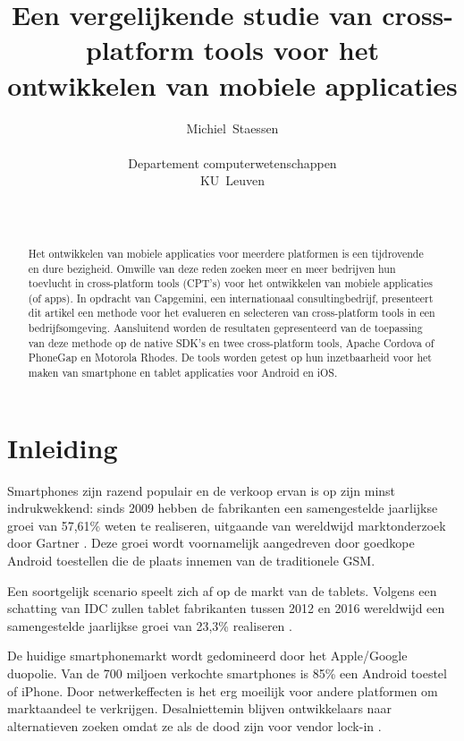 \documentclass[a4paper]{IEEEconf}
\newcommand{\citeGartner}{\cite{Gartner:08Q2, Gartner:08Q3, Gartner:08Q4, Gartner:10Q1, Gartner:10Q2, Gartner:10Q3, Gartner:10Q4, Gartner:11Q1, Gartner:11Q2, Gartner:11Q3, Gartner:11Q4, Gartner:12Q1, Gartner:12Q2, Gartner:12Q3, Gartner:12Q4, Gartner:13Q1}}
\begin{document}
\title{Een vergelijkende studie van cross-platform tools voor het ontwikkelen van mobiele applicaties}
\author{
    Michiel~Staessen \\
    \begin{affiliation}
       Departement computerwetenschappen\\
       KU~Leuven\\
    \end{affiliation} \\
}
\maketitle

\begin{abstract}
    Het ontwikkelen van mobiele applicaties voor meerdere platformen is een tijdrovende en dure bezigheid. Omwille van deze reden zoeken meer en meer bedrijven hun toevlucht in cross-platform tools (CPT's) voor het ontwikkelen van mobiele applicaties (of apps). In opdracht van Capgemini, een internationaal consultingbedrijf, presenteert dit artikel een methode voor het evalueren en selecteren van cross-platform tools in een bedrijfsomgeving. Aansluitend worden de resultaten gepresenteerd van de toepassing van deze methode op de native SDK's en twee cross-platform tools, Apache Cordova of PhoneGap en Motorola Rhodes. De tools worden getest op hun inzetbaarheid voor het maken van smartphone en tablet applicaties voor Android en iOS.
\end{abstract}

\section{Inleiding}

Smartphones zijn razend populair en de verkoop ervan is op zijn minst indrukwekkend: sinds 2009 hebben de fabrikanten een samengestelde jaarlijkse groei van 57,61\% weten te realiseren, uitgaande van wereldwijd marktonderzoek door Gartner \citeGartner. Deze groei wordt voornamelijk aangedreven door goedkope Android toestellen die de plaats innemen van de traditionele GSM. 

Een soortgelijk scenario speelt zich af op de markt van de tablets. Volgens een schatting van IDC zullen tablet fabrikanten tussen 2012 en 2016 wereldwijd een samengestelde jaarlijkse groei van 23,3\% realiseren \cite{IDC:tablet}.

De huidige smartphonemarkt wordt gedomineerd door het Apple/Google duopolie. Van de 700 miljoen verkochte smartphones is 85\% een Android toestel of iPhone. Door netwerkeffecten is het erg moeilijk voor andere platformen om marktaandeel te verkrijgen. Desalniettemin blijven ontwikkelaars naar alternatieven zoeken omdat ze als de dood zijn voor vendor lock-in \cite{VMDE:2013}.
\end{document}
